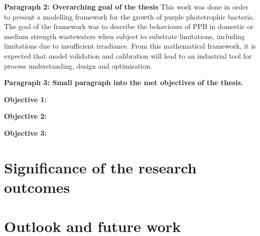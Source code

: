 \textbf{Paragraph 2: Overarching goal of the thesis}
This work was done in order to present a modelling framework for the growth of purple phototrophic bacteria. The goal of the framework was to describe the behaviours of PPB in domestic or medium strength wastewaters when subject to substrate limitations, including limitations due to insufficient irradiance. From this mathematical framework, it is expected that model validation and calibration will lead to an industrial tool for process understanding, design and optimisation. 

\textbf{Paragraph 3: Small paragraph into the met objectives of the thesis.}




\textbf{Objective 1: }







\textbf{Objective 2: }





\textbf{Objective 3: }


\section{Significance of the research outcomes}





\section{Outlook and future work}